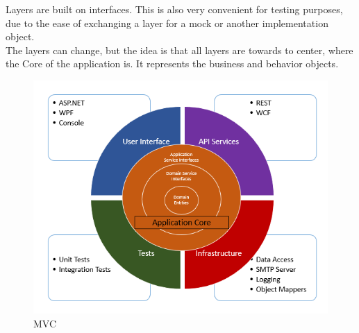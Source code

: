         Layers are built on interfaces. This is also very convenient for testing purposes, due to the ease of exchanging a layer for a mock or another implementation object. \\
        The layers can change, but the idea is that all layers are towards to center, where the Core of the application is. It represents the business and behavior objects. \\

        \begin{figure}[H]
            \centering
                \includegraphics[width=\textwidth]{assets/onion.png}
            \caption{MVC \cite{OnionArchitecture}}
            \label{fig:implementation_onion}
        \end{figure}

